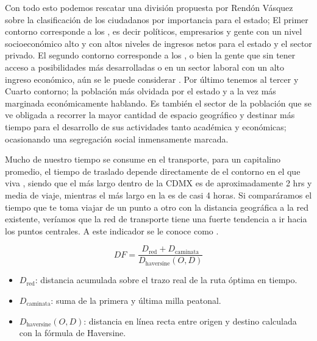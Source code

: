 Con todo esto podemos rescatar una división propuesta por Rendón Vásquez \cite{rendon2009ciudadanos} sobre la clasificación de los ciudadanos por
importancia para el estado; El primer contorno corresponde a los , es decir 
políticos, empresarios y gente con un nivel socioeconómico alto y con altos niveles de ingresos netos para el estado 
y el sector privado. El segundo contorno corresponde a los , o bien la gente 
que sin tener acceso a posibilidades más desarrolladas o en un sector laboral con un alto ingreso económico, aún se 
le puede considerar . Por último tenemos al tercer y Cuarto contorno; la población más olvidada 
por el estado y a la vez más marginada económicamente hablando. Es también el sector de la población que se ve obligada 
a recorrer la mayor cantidad de espacio geográfico y destinar más tiempo para el desarrollo de sus actividades tanto 
académica y económicas; ocasionando una segregación social inmensamente marcada.


Mucho de nuestro tiempo se consume en el transporte, para un capitalino promedio, el tiempo de traslado depende directamente 
de el contorno en el que viva \cite{semovi2020diagnostico, inegi_enoe_laboral}, siendo que el más largo dentro de la CDMX es 
de aproximadamente 2 hrs y media de viaje, mientras el más largo en la \zmvm es de casi 4 horas. Si comparáramos el tiempo que
te toma viajar de un punto a otro con la distancia geográfica a la red existente, veríamos que la red de 
transporte tiene una fuerte tendencia a ir hacia los puntos centrales. A este indicador se le conoce como 
.

\begin{equation}
    DF = \frac{D_{\text{red}} + D_{\text{caminata}}}{D_{\text{haversine}}(O, D)}
    \label{eq:detour-factor-res}
\end{equation}

\begin{itemize}
    \item $D_{\text{red}}$: distancia acumulada sobre el trazo real de la ruta
    óptima en tiempo.
    \item $D_{\text{caminata}}$: suma de la primera y última milla peatonal.
    \item $D_{\text{haversine}}(O,D)$: distancia en línea recta entre origen y
    destino calculada con la fórmula de Haversine.
\end{itemize}

